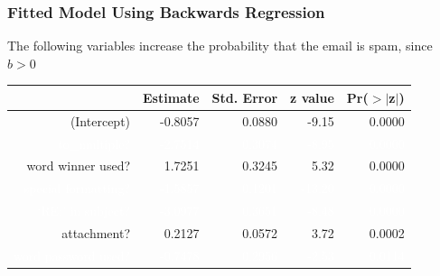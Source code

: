 \documentclass[handout]{beamer}
\newcommand{\blue}[1]{\textcolor{blue2}{#1}}
\newcommand{\white}[1]{\textcolor{white}{#1}}
\begin{document}
\begin{frame}[fragile]
\frametitle{Fitted Model Using Backwards Regression}
The following variables increase the probability that the email is spam, since $b>0$

\begin{table}[ht]
\centering
\begin{tabular}{r|rrrr}
  \hline
 & Estimate & Std. Error & z value & Pr($>$$|$z$|$) \\ 
  \hline
(Intercept) & -0.8057 & 0.0880 & -9.15 & 0.0000 \\ 
  \white{to\_multiple?} & \white{-2.7514} & \white{0.3074} & \white{-8.95} & \white{0.0000} \\ 
  \blue{word winner used?} & \blue{1.7251} & \blue{0.3245} & \blue{5.32} & \blue{0.0000} \\ 
  \white{special formatting?} & \white{-1.5857} & \white{0.1201} & \white{-13.20} & \white{0.0000} \\ 
  \white{`RE:' in subject?} & \white{-3.0977} & \white{0.3651} & \white{-8.48} & \white{0.0000} \\ 
  \blue{attachment?} & \blue{0.2127} & \blue{0.0572} & \blue{3.72} & \blue{0.0002} \\ 
  \white{word password used?} & \white{-0.7478} & \white{0.2956} & \white{-2.53} & \white{0.0114} \\ 
   \hline
\end{tabular}
\end{table} 

\end{frame}
\end{document}
